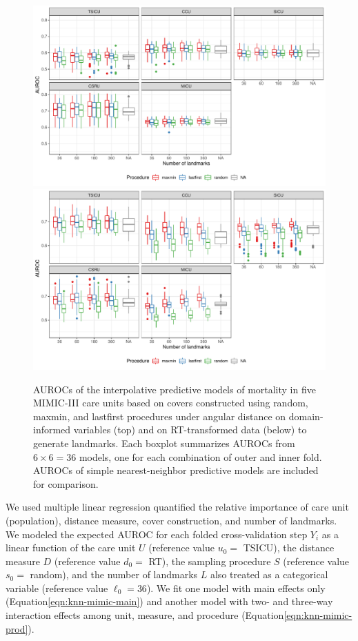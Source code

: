 \documentclass{article}
\begin{document}
\begin{figure}
\includegraphics[width=\textwidth,trim=0 55 0 0,clip=true]{knn-cos-auc-2}
\includegraphics[width=\textwidth]{knn-rt-auc-2}
\caption{
AUROCs of the interpolative predictive models of mortality in five MIMIC-III care units based on covers constructed using random, maxmin, and lastfirst procedures under angular distance on domain-informed variables (top) and on RT-transformed data (below) to generate landmarks.
Each boxplot summarizes AUROCs from $6 \times 6 = 36$ models, one for each combination of outer and inner fold.
AUROCs of simple nearest-neighbor predictive models are included for comparison.
\label{fig:knn-mimic-cos-rt}
}
\end{figure}

We used multiple linear regression quantified the relative importance of
care unit (population), distance measure, cover construction, and number
of landmarks. We modeled the expected AUROC for each folded
cross-validation step \(Y_i\) as a linear function of the care unit
\(U\) (reference value \(u_0 =\) TSICU), the distance measure \(D\)
(reference value \(d_0 =\) RT), the sampling procedure \(S\) (reference
value \(s_0 =\) random), and the number of landmarks \(L\) also treated
as a categorical variable (reference value \(\ell_0 = 36\)). We fit one
model with main effects only (Equation\nbs\ref{eqn:knn-mimic-main}) and
another model with two- and three-way interaction effects among unit,
measure, and procedure (Equation\nbs\ref{eqn:knn-mimic-prod}).
\end{document}
